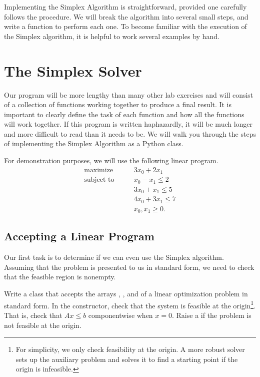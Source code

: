 Implementing the Simplex Algorithm is straightforward, provided one carefully follows the procedure.
We will break the algorithm into several small steps, and write a function to perform each one.
To become familiar with the execution of the Simplex algorithm, it is helpful to work several examples by hand.

\section*{The Simplex Solver} %

Our program will be more lengthy than many other lab exercises and will consist of a collection of functions working together to produce a final result.
It is important to clearly define the task of each function and how all the functions will work together.
If this program is written haphazardly, it will be much longer and more difficult to read than it needs to be.
We will walk you through the steps of implementing the Simplex Algorithm as a Python class.

For demonstration purposes, we will use the following linear program.
\begin{align*}
\text{maximize}\qquad & 3x_0 + 2x_1 \\
\text{subject to}\qquad
& x_0 - x_1 \leq 2 \\
& 3x_0 + x_1 \leq 5 \\
& 4x_0 + 3x_1 \leq 7 \\
& x_0, x_1 \geq 0.
\end{align*}

\subsection*{Accepting a Linear Program} %

Our first task is to determine if we can even use the Simplex algorithm.
Assuming that the problem is presented to us in standard form, we need
to check that the feasible region is nonempty.

\begin{problem}
Write a class that accepts the arrays , , and  of a linear optimization problem in standard form.
In the constructor, check that the system is feasible at the origin\footnote{For simplicity, we only check feasibility at the origin. A more robust solver sets up the auxiliary problem and solves it to find a starting point if the origin is infeasible.}.
That is, check that $Ax \leq b$ componentwise when $x = 0$. %
Raise a  if the problem is not feasible at the origin.
\label{prob:initsolver}
\end{problem}

